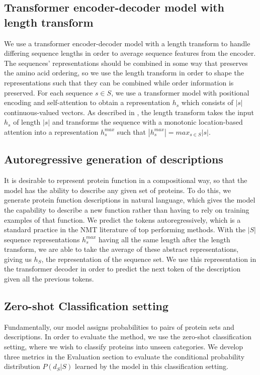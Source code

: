\documentclass{article}
\begin{document}
    \subsection{Transformer encoder-decoder model with length transform}
    We use a transformer encoder-decoder model \citep{vaswani2017attention} with a length transform to handle differing sequence lengths in order to average sequence features from the encoder. 
    The sequences' representations should be combined in some way that preserves the amino acid ordering, so we use the length transform in order to shape the representations such that they can be combined while order information is preserved.
    For each sequence $s \in S$, we use a transformer model with positional encoding and self-attention to obtain a representation $h_{s}$ which consists of $|s|$ continuous-valued vectors. 
    As described in \cite{shu2020latent}, the length transform takes the input $h_{s}$ of length $|s|$ and transforms the sequence with a monotonic location-based attention into a representation $h^{max}_{s}$ such that $|h^{max}_{s}| = max_{s \in S}|s|$. 
    
    \subsection{Autoregressive generation of descriptions}
    It is desirable to represent protein function in a compositional way, so that the model has the ability to describe any given set of proteins. To do this, we generate protein function descriptions in natural language, which gives the model the capability to describe a new function rather than having to rely on training examples of that function. We predict the tokens autoregressively, which is a standard practice in the NMT literature of top performing methods.
    With the $|S|$ sequence representations $h^{max}_{s}$ having all the same length after the length transform, we are able to take the average of these abstract representations, giving us $h_{S}$, the representation of the sequence set. We use this representation in the transformer decoder in order to predict the next token of the description given all the previous tokens.

    \subsection{Zero-shot Classification setting}
Fundamentally, our model assigns probabilities to pairs of protein sets and descriptions. In order to evaluate the method, we use the zero-shot classification setting, where we wish to classify proteins into unseen categories. We develop three metrics in the Evaluation section to evaluate the conditional probability distribution $P(d_{S}|S)$ learned by the model in this classification setting.
\end{document}
